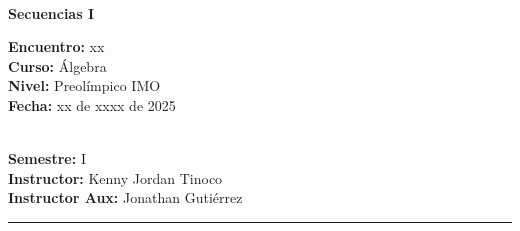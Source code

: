 \begin{center}
    \ \\
    \vspace{-1mm}
    \textbf{\Large Secuencias I}
\end{center}
\vspace{-5mm}
\begin{multicols}{2}
{
    \textbf{Encuentro:} xx\\
    \textbf{Curso:} Álgebra\\
    \textbf{Nivel:} Preolímpico IMO\\
    \textbf{Fecha:} xx de xxxx de 2025\\
    \begin{flushright}
        \ \\
        \textbf{Semestre:} I\\
        \textbf{Instructor:} Kenny Jordan Tinoco\\
        \textbf{Instructor Aux:} Jonathan Gutiérrez
    \end{flushright}
}
\end{multicols}
\vspace{-4mm}
\hrule
\tableofcontents

\thispagestyle{first-page-style}